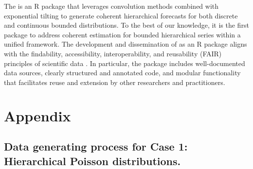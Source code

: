 The  is an R package that leverages convolution methods combined with exponential tilting to generate coherent hierarchical forecasts for both discrete and continuous bounded distributions.
To the best of our knowledge, it is the first package to address coherent estimation for bounded hierarchical series within a unified framework. The development and dissemination of  as an R package aligns with the findability, accessibility, interoperability, and reusability (FAIR) principles of scientific data \citep{gofair_fair_principles}. In particular, the package includes well-documented data sources, clearly structured and annotated code, and modular functionality that facilitates reuse and extension by other researchers and practitioners.

\section{Appendix}\label{appendix}

\subsection{Data generating process for Case 1: Hierarchical Poisson distributions.}\label{data-generating-process-for-case-1-hierarchical-poisson-distributions.}

